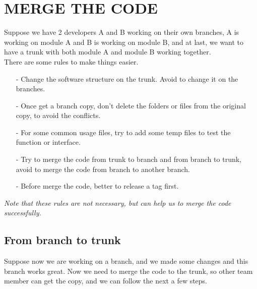 \documentclass{article}
\begin{document}
\section{MERGE THE CODE}
Suppose we have 2 developers A and B working on their own branches, A is working on module A and B is working on module B, and at last, we want to have a trunk with both module A and module B working together.\\
There are some rules to make things easier.
\begin{itemize}
\item[-] Change the software structure on the trunk. Avoid to change it on the branches.
\item[-] Once get a branch copy, don't delete the folders or files from the original copy, to avoid the conflicts.
\item[-] For some common usage files, try to add some temp files to test the function or interface.
\item[-] Try to merge the code from trunk to branch and from branch to trunk, avoid to merge the code from branch to another branch.
\item[-] Before merge the code, better to release a tag first.
\end{itemize}
\textit{Note that these rules are not necessary, but can help us to merge the code successfully.}


\subsection{From branch to trunk}
Suppose now we are working on a branch, and we made some changes and this branch works great. Now we need to merge the code to the trunk, so other team member can get the copy, and we can follow the next a few steps.
\end{document}
